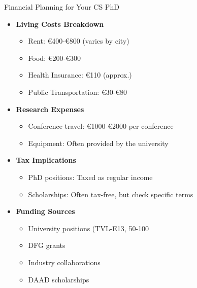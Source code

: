 \documentclass[aspectratio=169,10pt]{beamer}
\begin{document}
\begin{frame}{Financial Planning for Your CS PhD}
\begin{itemize}
    \item \textbf{Living Costs Breakdown}
    \begin{itemize}
        \item Rent: €400-€800 (varies by city)
        \item Food: €200-€300
        \item Health Insurance: €110 (approx.)
        \item Public Transportation: €30-€80
    \end{itemize}
    \item \textbf{Research Expenses}
    \begin{itemize}
        \item Conference travel: €1000-€2000 per conference
        \item Equipment: Often provided by the university
    \end{itemize}
    \item \textbf{Tax Implications}
    \begin{itemize}
        \item PhD positions: Taxed as regular income
        \item Scholarships: Often tax-free, but check specific terms
    \end{itemize}
    \item \textbf{Funding Sources}
    \begin{itemize}
        \item University positions (TVL-E13, 50-100%
        \item DFG grants
        \item Industry collaborations
        \item DAAD scholarships
    \end{itemize}
\end{itemize}
\end{frame}
\end{document}
